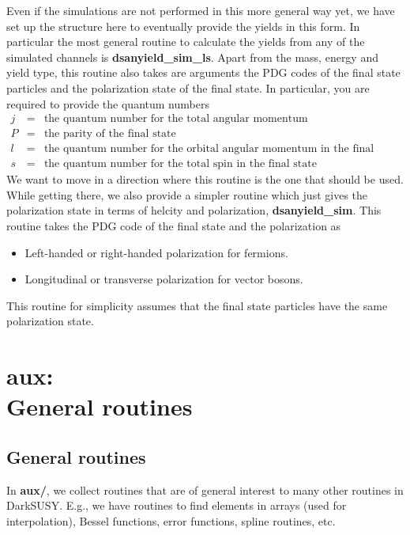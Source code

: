 \documentclass[a4paper,10pt,oneside]{book}
\newcommand{\codeb}[1]{\ftb{#1}}
\newcommand{\ds}{{\sffamily DarkSUSY}}
\newcommand{\ftb}[1]{{\bfseries \sffamily #1}}
\begin{document}
Even if the simulations are not performed in this more general way yet, we have set up the structure here to eventually provide the yields in this form. In particular the most general routine to calculate the yields from any of the simulated channels is \ftb{dsanyield\_sim\_ls}. Apart from the mass, energy and yield type, this routine also takes are arguments the PDG codes of the final state particles and the polarization state of the final state. In particular, you are required to provide the quantum numbers
\begin{eqnarray*}
j &=& \mbox{the quantum number for the total angular momentum} \\
P &=& \mbox{the parity of the final state}\\
l &=& \mbox{the quantum number for the orbital angular momentum in the final state} \\
s &=& \mbox{the quantum number for the total spin in the final state} 
\end{eqnarray*}
We want to move in a direction where this routine is the one that should be used. While getting there, we also provide a simpler routine which just gives the polarization state in terms of helcity and polarization, \ftb{dsanyield\_sim}. This routine takes the PDG code of the final state and the polarization as
\begin{itemize}
\item Left-handed or right-handed polarization for fermions. 
\item Longitudinal or transverse polarization for vector bosons.
\end{itemize}
This routine for simplicity assumes that the final state particles have the same polarization state.



\chapter[aux: General routines]{\codeb{aux}:\\ General routines}
\label{ch:src/aux}

\section{General routines}

In \codeb{aux/}, we collect routines that are of general interest to
many other routines in \ds. E.g., we have routines to find elements in
arrays (used for interpolation), Bessel functions, error functions,
spline routines, etc.
\end{document}
